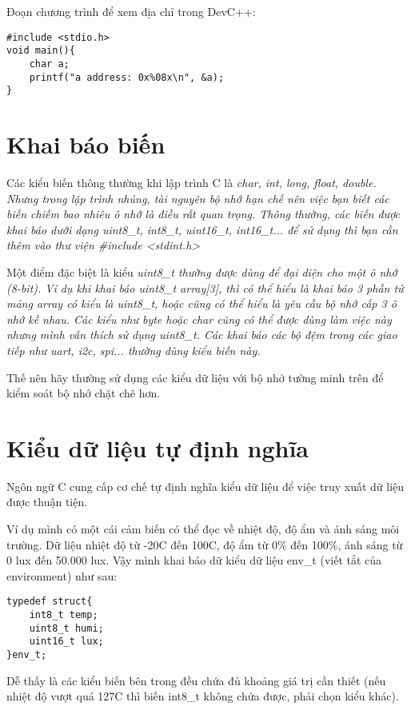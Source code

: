Đoạn chương trình để xem địa chỉ trong DevC++:\*
\begin{lstlisting}
#include <stdio.h>
void main(){
    char a;
    printf("a address: 0x%08x\n", &a);
}
\end{lstlisting}


\section{Khai báo biến}

Các kiểu biến thông thường khi lập trình C là \it{char, int, long, float, double}. Nhưng trong lập trình nhúng, tài nguyên bộ nhớ hạn chế nên việc bạn biết các biến chiếm bao nhiêu ô nhớ là điều rất quan trọng. Thông thường, các biến được khai báo dưới dạng \it{uint8\_t}, \it{int8\_t}, \it{uint16\_t}, \it{int16\_t}... để sử dụng thì bạn cần thêm vào thư viện \it{\#include <stdint.h>}

Một điểm đặc biệt là kiểu \it{uint8\_t} thường được dùng để đại diện cho một ô nhớ (8-bit). Ví dụ khi khai báo \it{uint8\_t array[3]}, thì có thể hiểu là khai báo 3 phần tử mảng array có kiểu là \it{uint8\_t}, hoặc cũng có thể hiểu là yêu cầu bộ nhớ cấp 3 ô nhớ kề nhau. Các kiểu như byte hoặc char cũng có thể được dùng làm việc này nhưng mình vẫn thích sử dụng \it{uint8\_t}. Các khai báo các bộ đệm trong các giao tiếp như uart, i2c, spi... thường dùng kiểu biến này.

Thế nên hãy thường sử dụng các kiểu dữ liệu với bộ nhớ tường minh trên để kiểm soát bộ nhớ chặt chẽ hơn.

\section{Kiểu dữ liệu tự định nghĩa}

Ngôn ngữ C cung cấp cơ chế tự định nghĩa kiểu dữ liệu để việc truy xuất dữ liệu được thuận tiện.

Ví dụ mình có một cái cảm biến có thể đọc về nhiệt độ, độ ẩm và ánh sáng môi trường. Dữ liệu nhiệt độ từ  -20\textdegree{}C đến 100\textdegree{}C, độ ẩm từ 0\% đến 100\%, ánh sáng từ 0 lux đến 50.000 lux. Vậy mình khai báo dữ kiểu dữ liệu env\_t (viết tắt của environment) như sau:

\begin{lstlisting}
typedef struct{
    int8_t temp;
    uint8_t humi;
    uint16_t lux;
}env_t;
\end{lstlisting}

Dễ thấy là các kiểu biến bên trong đều chứa đủ khoảng giá trị cần thiết (nếu nhiệt độ vượt quá 127\textdegree{}C thì biến int8\_t không chứa được, phải chọn kiểu khác).

